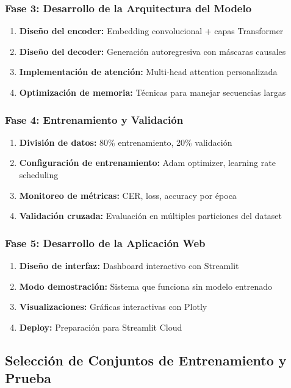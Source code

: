 \documentclass[12pt,a4paper]{article}
\begin{document}
\subsubsection{Fase 3: Desarrollo de la Arquitectura del Modelo}
\begin{enumerate}
    \item \textbf{Diseño del encoder:} Embedding convolucional + capas Transformer
    \item \textbf{Diseño del decoder:} Generación autoregresiva con máscaras causales
    \item \textbf{Implementación de atención:} Multi-head attention personalizada
    \item \textbf{Optimización de memoria:} Técnicas para manejar secuencias largas
\end{enumerate}

\subsubsection{Fase 4: Entrenamiento y Validación}
\begin{enumerate}
    \item \textbf{División de datos:} 80\% entrenamiento, 20\% validación
    \item \textbf{Configuración de entrenamiento:} Adam optimizer, learning rate scheduling
    \item \textbf{Monitoreo de métricas:} CER, loss, accuracy por época
    \item \textbf{Validación cruzada:} Evaluación en múltiples particiones del dataset
\end{enumerate}

\subsubsection{Fase 5: Desarrollo de la Aplicación Web}
\begin{enumerate}
    \item \textbf{Diseño de interfaz:} Dashboard interactivo con Streamlit
    \item \textbf{Modo demostración:} Sistema que funciona sin modelo entrenado
    \item \textbf{Visualizaciones:} Gráficas interactivas con Plotly
    \item \textbf{Deploy:} Preparación para Streamlit Cloud
\end{enumerate}

\subsection{Selección de Conjuntos de Entrenamiento y Prueba}
\end{document}
